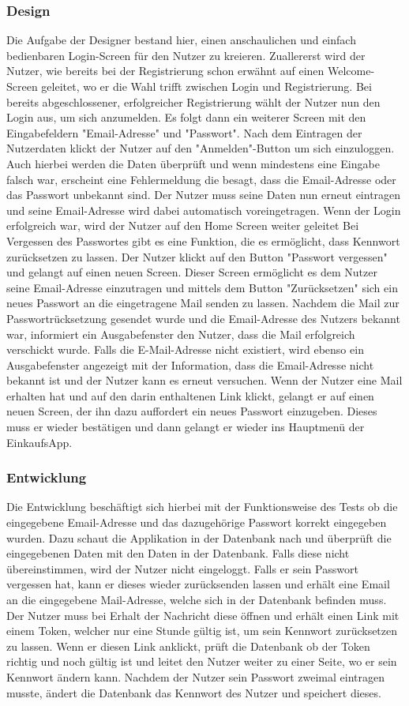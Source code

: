 \documentclass[12pt,a4paper]{article}
\begin{document}
\subsubsection*{Design}
Die Aufgabe der Designer bestand hier, einen anschaulichen und einfach bedienbaren Login-Screen für den Nutzer zu kreieren. Zuallererst wird der Nutzer, wie bereits bei der Registrierung schon erwähnt auf einen Welcome-Screen geleitet, wo er die Wahl trifft zwischen Login und Registrierung.
Bei bereits abgeschlossener, erfolgreicher Registrierung wählt der Nutzer nun den Login aus, um sich anzumelden. Es folgt dann ein weiterer Screen mit den Eingabefeldern "Email-Adresse" und "Passwort".
Nach dem Eintragen der Nutzerdaten klickt der Nutzer auf den "Anmelden"-Button um sich einzuloggen.
Auch hierbei werden die Daten überprüft und wenn mindestens eine Eingabe falsch war, erscheint eine Fehlermeldung die besagt, dass die Email-Adresse oder das Passwort unbekannt sind.
Der Nutzer muss seine Daten nun erneut eintragen und seine Email-Adresse wird dabei automatisch voreingetragen. Wenn der Login erfolgreich war, wird der Nutzer auf den Home Screen weiter geleitet 
Bei Vergessen des Passwortes gibt es eine Funktion, die es ermöglicht, dass Kennwort zurücksetzen zu lassen. Der Nutzer klickt auf den Button "Passwort vergessen" und gelangt auf einen neuen Screen. Dieser Screen ermöglicht es dem Nutzer seine Email-Adresse einzutragen und mittels dem Button "Zurücksetzen" sich ein neues Passwort an die eingetragene Mail senden zu lassen.
Nachdem die Mail zur Passwortrücksetzung gesendet wurde und die Email-Adresse des Nutzers bekannt war, informiert ein Ausgabefenster den Nutzer, dass die Mail erfolgreich verschickt wurde.
Falls die E-Mail-Adresse nicht existiert, wird ebenso ein Ausgabefenster angezeigt mit der Information, dass die Email-Adresse nicht bekannt ist und der Nutzer kann es erneut versuchen.
Wenn der Nutzer eine Mail erhalten hat und auf den darin enthaltenen Link klickt, gelangt er auf einen neuen Screen, der ihn dazu auffordert ein neues Passwort einzugeben.
Dieses muss er wieder bestätigen und dann gelangt er wieder ins Hauptmenü der EinkaufsApp.
\subsubsection*{Entwicklung}
Die Entwicklung beschäftigt sich hierbei mit der Funktionsweise des Tests ob die eingegebene Email-Adresse und das dazugehörige Passwort korrekt eingegeben wurden.
Dazu schaut die Applikation in der Datenbank nach und überprüft die eingegebenen Daten mit den Daten in der Datenbank. Falls diese nicht übereinstimmen, wird der Nutzer nicht eingeloggt.
Falls er sein Passwort vergessen hat, kann er dieses wieder zurücksenden lassen und erhält eine Email an die eingegebene Mail-Adresse, welche  sich in der Datenbank befinden muss.
Der Nutzer muss bei Erhalt der Nachricht diese öffnen und erhält einen Link mit einem Token, welcher nur eine Stunde gültig ist, um sein Kennwort zurücksetzen zu lassen. 
Wenn er  diesen Link anklickt, prüft die Datenbank ob der Token richtig und noch gültig ist und leitet den Nutzer weiter zu einer Seite, wo er sein Kennwort ändern kann.
Nachdem der Nutzer sein Passwort zweimal eintragen musste, ändert die Datenbank das Kennwort des Nutzer und speichert dieses.
\end{document}
